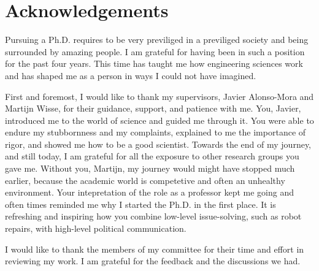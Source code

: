 \chapter*{Acknowledgements}
\label{acknowledgements}



Pursuing a Ph.D. requires to be very previliged in a previliged society and
being surrounded by amazing people. I am grateful for having been in such a
position for the past four years. This time has taught me how engineering
sciences work and has shaped me as a person in ways I could not have imagined.

First and foremost, I would like to thank my supervisors, Javier Alonso-Mora and
Martijn Wisse, for their guidance, support, and patience with me. You, Javier,
introduced me to the world of science and guided me through it. You were able to
endure my stubbornness and my complaints, explained to me the importance of
rigor, and showed me how to be a good scientist.
Towards the end of my
journey, and still today, I am grateful for all the exposure to other research
groups you gave me. Without you, Martijn, my journey would might have stopped
much earlier, because the academic world is competetive and often an unhealthy
environment. Your intepretation of the role as a professor kept me going and
often times reminded me why I started the Ph.D. in the first place. It is
refreshing and inspiring how you combine low-level issue-solving, such as robot
repairs, with high-level political communication.

I would like to thank the members of my committee for their time and effort in
reviewing my work. I am grateful for the feedback and the discussions we had.

